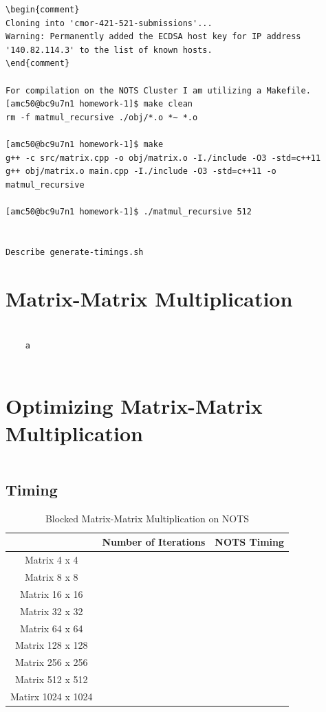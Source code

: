 \documentclass{article}
\begin{document}
\begin{verbatim}
\begin{comment}
Cloning into 'cmor-421-521-submissions'...
Warning: Permanently added the ECDSA host key for IP address '140.82.114.3' to the list of known hosts.
\end{comment}

For compilation on the NOTS Cluster I am utilizing a Makefile.
[amc50@bc9u7n1 homework-1]$ make clean
rm -f matmul_recursive ./obj/*.o *~ *.o

[amc50@bc9u7n1 homework-1]$ make
g++ -c src/matrix.cpp -o obj/matrix.o -I./include -O3 -std=c++11
g++ obj/matrix.o main.cpp -I./include -O3 -std=c++11 -o matmul_recursive

[amc50@bc9u7n1 homework-1]$ ./matmul_recursive 512


Describe generate-timings.sh

\end{verbatim}

\section{Matrix-Matrix Multiplication}
\begin{verbatim}

    a
    
\end{verbatim}

\section{Optimizing Matrix-Matrix Multiplication}
\begin{verbatim}
\end{verbatim}

\subsection{Timing}
    \begin{table}[ht!]
        \begin{flushleft}
        \caption{Blocked Matrix-Matrix Multiplication on NOTS}
        \begin{tabular}{|c|c|c|}
            \hline
            & Number of Iterations & NOTS Timing \\
            \hline
            Matrix 4 x 4 & & \\
            \hline
            Matrix 8 x 8 & & \\
            \hline
            Matrix 16 x 16 & & \\
            \hline
            Matrix 32 x 32 & & \\
            \hline
            Matrix 64 x 64 & & \\
            \hline
            Matrix 128 x 128 & & \\
            \hline
            Matrix 256 x 256 & & \\
            \hline
            Matrix 512 x 512 & & \\
            \hline 
            Matirx 1024 x 1024 & & \\
        \end{tabular}
    \end{flushleft}
\end{table}
\end{document}
